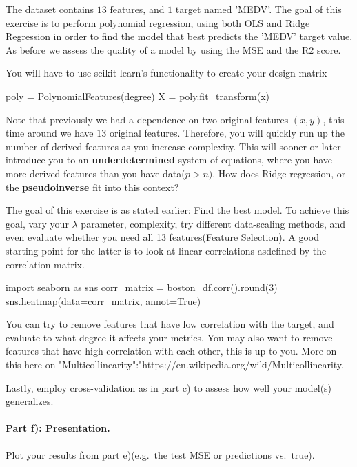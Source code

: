 \documentclass[%
oneside,                 %
final,                   %
10pt]{article}
\begin{document}
\epycod


The dataset contains $13$ features, and $1$ target named 'MEDV'.  The
goal of this exercise is to perform polynomial regression, using both
OLS and Ridge Regression in order to find the model that best predicts
the 'MEDV' target value. As before we assess the quality of a model by
using the MSE and the R2 score.

You will have to use scikit-learn's functionality to create your
design matrix



\bpycod
poly = PolynomialFeatures(degree)
X = poly.fit_transform(x)

\epycod


Note that previously we had a dependence on
two original features $(x,y)$, this time around we have $13$ original
features. Therefore, you will quickly run up the number of derived
features as you increase complexity. This will sooner or later
introduce you to an \textbf{underdetermined} system of equations, where you
have more derived features than you have data($p>n)$. How does Ridge
regression, or the \textbf{pseudoinverse} fit into this context?

The goal of this exercise is as stated earlier: Find the best model.
To achieve this goal, vary your $\lambda$ parameter, complexity, try
different data-scaling methods, and even evaluate whether you need all
13 features(Feature Selection). A good starting point for the latter
is to look at linear correlations asdefined by the correlation matrix.





\bpycod
import seaborn as sns
corr_matrix = boston_df.corr().round(3)
sns.heatmap(data=corr_matrix, annot=True)

\epycod


You can try to remove features that have low correlation with the
target, and evaluate to what degree it affects your metrics. You may
also want to remove features that have high correlation with each
other, this is up to you.  More on this here on
"Multicollinearity":"https://en.wikipedia.org/wiki/Multicollinearity.

Lastly, employ cross-validation as in part c) to assess how well your
model(s) generalizes.

\paragraph{Part f): Presentation.}
Plot your results from part e)(e.g.~the test MSE or predictions vs.~true).
\end{document}
